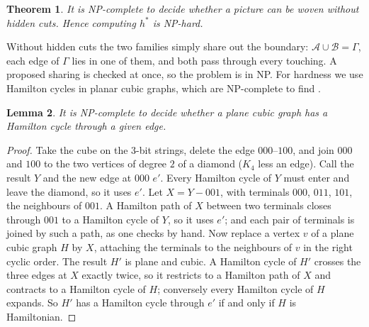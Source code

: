 \documentclass[11pt,a4paper]{article}
\newtheorem{theorem}{Theorem}
\newtheorem{lemma}[theorem]{Lemma}
\theoremstyle{definition}
\theoremstyle{remark}
\newcommand{\A}{\mathcal{A}}
\newcommand{\B}{\mathcal{B}}
\begin{document}
\begin{theorem}\label{thm:hard}
It is NP-complete to decide whether a picture can be woven without hidden
cuts. Hence computing $h^*$ is NP-hard.
\end{theorem}

Without hidden cuts the two families simply share out the boundary:
$\A\cup\B=\Gamma$, each edge of $\Gamma$ lies in one of them, and both pass
through every touching. A proposed sharing is checked at once, so the
problem is in NP. For hardness we use Hamilton cycles in planar cubic
graphs, which are NP-complete to find \cite{gjt}.

\begin{lemma}\label{lem:edge}
It is NP-complete to decide whether a plane cubic graph has a Hamilton
cycle through a given edge.
\end{lemma}
\begin{proof}
Take the cube on the $3$-bit strings, delete the edge $000$--$100$, and
join $000$ and $100$ to the two vertices of degree $2$ of a diamond ($K_4$
less an edge). Call the result $Y$ and the new edge at $000$ $e'$. Every
Hamilton cycle of $Y$ must enter and leave the diamond, so it uses $e'$.
Let $X=Y-001$, with terminals $000$, $011$, $101$, the neighbours of
$001$. A Hamilton path of $X$ between two terminals closes through $001$ to
a Hamilton cycle of $Y$, so it uses $e'$; and each pair of terminals is
joined by such a path, as one checks by hand. Now replace a vertex $v$ of
a plane cubic graph $H$ by $X$, attaching the terminals to the neighbours
of $v$ in the right cyclic order. The result $H'$ is plane and cubic. A
Hamilton cycle of $H'$ crosses the three edges at $X$ exactly twice, so it
restricts to a Hamilton path of $X$ and contracts to a Hamilton cycle of
$H$; conversely every Hamilton cycle of $H$ expands. So $H'$ has a
Hamilton cycle through $e'$ if and only if $H$ is Hamiltonian.
\end{proof}
\end{document}
